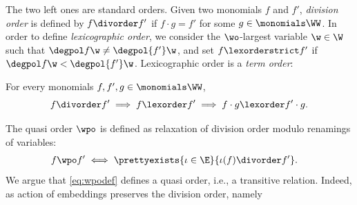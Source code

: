 The two left ones are standard orders.
Given two monomials $f$ and $f'$,
\emph{division order} is defined by
$f \divorder f'$ if $f \cdot g = f'$ for some $g\in\monomials \WW$.
In order to define \emph{lexicographic order}, 
we consider the $\wo$-largest variable $\w\in\W$ such that $\degpol f \w \neq \degpol {f'} \w$, and
set $f\lexorderstrict f'$ if $\degpol f \w < \degpol {f'} \w$.
Lexicographic order is a \emph{term order}:
%
\begin{lemma} \label{lem:lex is to}
For every monomials $f, f', g\in\monomials \WW$, 
\[
f\divorder f' \implies f \lexorder f' \implies f\cdot g \lexorder f' \cdot g.
\]
\end{lemma}
%
%
The quasi order $\wpo$ is defined as relaxation of division order modulo renamings of variables:
%
\begin{align}  
\begin{aligned}
\label{eq:wpodef}
f \wpo f' & \iff \prettyexists{\iota \in \E}{\iota(f) \divorder f'}.
\end{aligned}
\end{align}
%
%
We argue that \eqref{eq:wpodef} defines a quasi order, i.e., a transitive relation. 
Indeed, as action of embeddings preserves the division order, namely 
